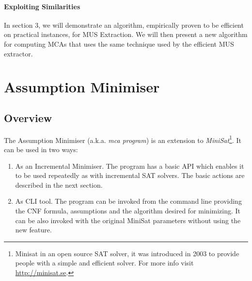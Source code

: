 \documentclass[]{article}
\begin{document}
	\paragraph{Exploiting Similarities} In section 3, we will demonstrate an algorithm, empirically proven \cite{MUSRMR} to be efficient on practical instances, for MUS Extraction. We will then present a new algorithm for computing MCAs that uses the same technique used by the efficient MUS extractor.

	\pagebreak
	\section{Assumption Minimiser}
	\subsection{Overview}
		The Assumption Minimiser (a.k.a. \textit{mca program}) is an extension to \textit{MiniSat}\footnote{Minisat in an open source SAT solver, it was introduced in 2003 to provide people with a simple and efficient solver. For more info visit \url{http://minisat.se}.}. It can be used in two ways:
		\begin{enumerate}
				\item As an Incremental Minimiser. The program has a basic API which enables it to be used repeatedly as with incremental SAT solvers. The basic actions are described in the next section.
				\item As CLI tool. The program can be invoked from the command line providing the CNF formula, assumptions and the algorithm desired for minimizing. It can be also invoked with the original MiniSat parameters without using the new feature.
		\end{enumerate}
	
\end{document}
